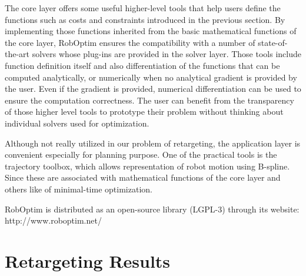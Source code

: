 \documentclass[letterpaper, 10 pt, conference]{ieeeconf}  %
\begin{document}
The core layer offers some useful higher-level tools that help users
define the functions such as costs and constraints introduced in the
previous section.  
By implementing those functions inherited from the basic
mathematical functions of the core layer,  RobOptim ensures the
compatibility with a number of state-of-the-art solvers whose plug-ins
are provided in the solver layer.
Those tools include function definition itself and also
differentiation of the functions that can be computed analytically, or numerically 
when no analytical gradient is provided by the user. Even if the
gradient is provided, numerical differentiation can be used to ensure
the computation correctness.
The user can benefit from the transparency of those higher level
tools to prototype their problem
without thinking about individual solvers used for optimization.

Although not really utilized in our problem of retargeting, the
application layer is convenient especially for planning purpose.
One of the practical tools is the trajectory toolbox,
which allows representation of robot motion using B-spline. Since
these are associated with mathematical functions of the core layer and
others like of minimal-time optimization.


RobOptim is distributed as an open-source library (\mbox{LGPL-3}) through its
website: http://www.roboptim.net/



\section{Retargeting Results}
\label{sec:results}


\end{document}
